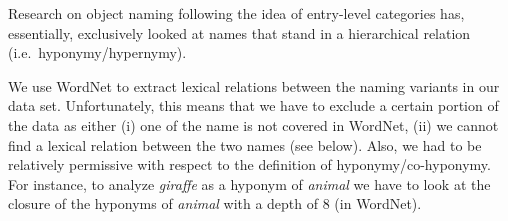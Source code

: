 \begin{table}


\caption{Lexical relations of naming variants in MN to annotated VG synset, averaged over synsets}
\label{tab:rel}
\end{table}


Research on object naming following the idea of entry-level categories has, essentially, exclusively looked at names that stand in a hierarchical relation (i.e.\ hyponymy/hypernymy).

We use WordNet to extract lexical relations between the naming variants in our data set.
Unfortunately, this means that we have to exclude a certain portion of the data as either (i) one of the name is not covered in WordNet, (ii) we cannot find a lexical relation between the two names (see below). Also, we had to be relatively permissive with respect to the definition of hyponymy/co-hyponymy. 
For instance, to analyze \textit{giraffe} as a hyponym of \textit{animal} we have to look at the closure of the hyponyms of \textit{animal} with a depth of 8 (in WordNet).

